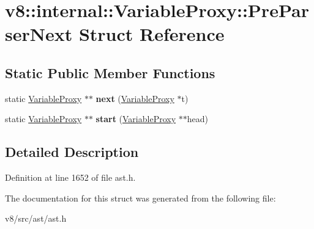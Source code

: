 \hypertarget{structv8_1_1internal_1_1VariableProxy_1_1PreParserNext}{}\section{v8\+:\+:internal\+:\+:Variable\+Proxy\+:\+:Pre\+Parser\+Next Struct Reference}
\label{structv8_1_1internal_1_1VariableProxy_1_1PreParserNext}
\subsection*{Static Public Member Functions}
\begin{DoxyCompactItemize}
\item 
\mbox{\label{structv8_1_1internal_1_1VariableProxy_1_1PreParserNext_a4a995e8a265d990e72e87d725bb842c3}} 
static \mbox{\hyperlink{classv8_1_1internal_1_1VariableProxy}{Variable\+Proxy}} $\ast$$\ast$ {\bfseries next} (\mbox{\hyperlink{classv8_1_1internal_1_1VariableProxy}{Variable\+Proxy}} $\ast$t)
\item 
\mbox{\label{structv8_1_1internal_1_1VariableProxy_1_1PreParserNext_acb49ec508b1170309e6262d33719ce12}} 
static \mbox{\hyperlink{classv8_1_1internal_1_1VariableProxy}{Variable\+Proxy}} $\ast$$\ast$ {\bfseries start} (\mbox{\hyperlink{classv8_1_1internal_1_1VariableProxy}{Variable\+Proxy}} $\ast$$\ast$head)
\end{DoxyCompactItemize}


\subsection{Detailed Description}


Definition at line 1652 of file ast.\+h.



The documentation for this struct was generated from the following file\+:\begin{DoxyCompactItemize}
\item 
v8/src/ast/ast.\+h\end{DoxyCompactItemize}
